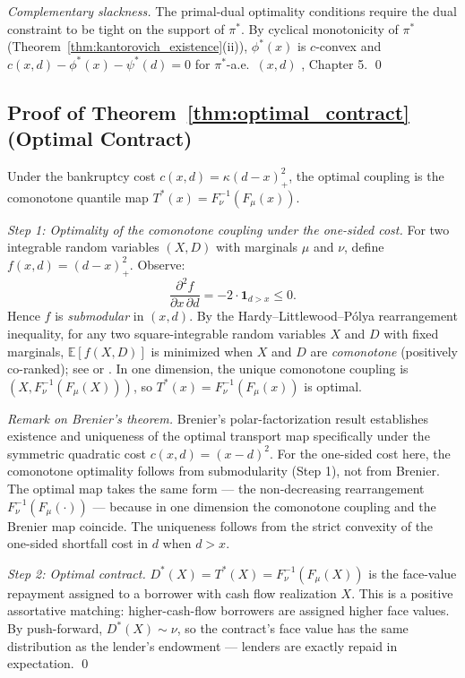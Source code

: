 \emph{Complementary slackness.} The primal-dual optimality conditions require the dual constraint to be tight on the support of $\pi^*$. By cyclical monotonicity of $\pi^*$ (Theorem~\ref{thm:kantorovich_existence}(ii)), $\phi^*(x)$ is $c$-convex and $c(x,d) - \phi^*(x) - \psi^*(d) = 0$ for $\pi^*$-a.e.\ $(x,d)$ \citep{villani2009optimal}, Chapter 5. \qed

\subsection*{Proof of Theorem~\ref{thm:optimal_contract} (Optimal Contract)}

Under the bankruptcy cost $c(x,d)=\kappa(d-x)_+^2$, the optimal coupling is the comonotone quantile map $T^*(x) = F_\nu^{-1}(F_\mu(x))$.

\emph{Step 1: Optimality of the comonotone coupling under the one-sided cost.}
For two integrable random variables $(X,D)$ with marginals $\mu$ and $\nu$, define $f(x,d) = (d-x)_+^2$. Observe:
\[
  \frac{\partial^2 f}{\partial x \,\partial d} = -2 \cdot \mathbf{1}_{d > x} \leq 0.
\]
Hence $f$ is \emph{submodular} in $(x,d)$. By the Hardy--Littlewood--P\'{o}lya rearrangement inequality, for any two square-integrable random variables $X$ and $D$ with fixed marginals, $\mathbb{E}[f(X,D)]$ is minimized when $X$ and $D$ are \emph{comonotone} (positively co-ranked); see \citet[Theorem 368]{hardylittlewoodpolya1952} or \citet[Proposition 2.1]{tchen1980inequalities}. In one dimension, the unique comonotone coupling is $(X, F_\nu^{-1}(F_\mu(X)))$, so $T^*(x) = F_\nu^{-1}(F_\mu(x))$ is optimal.

\emph{Remark on Brenier's theorem.} Brenier's polar-factorization result establishes existence and uniqueness of the optimal transport map specifically under the symmetric quadratic cost $c(x,d) = (x-d)^2$. For the one-sided cost here, the comonotone optimality follows from submodularity (Step 1), not from Brenier. The optimal map takes the same form --- the non-decreasing rearrangement $F_\nu^{-1}(F_\mu(\cdot))$ --- because in one dimension the comonotone coupling and the Brenier map coincide. The uniqueness follows from the strict convexity of the one-sided shortfall cost in $d$ when $d > x$.

\emph{Step 2: Optimal contract.}
$D^*(X) = T^*(X) = F_\nu^{-1}(F_\mu(X))$ is the face-value repayment assigned to a borrower with cash flow realization $X$. This is a positive assortative matching: higher-cash-flow borrowers are assigned higher face values. By push-forward, $D^*(X) \sim \nu$, so the contract's face value has the same distribution as the lender's endowment — lenders are exactly repaid in expectation. \qed

